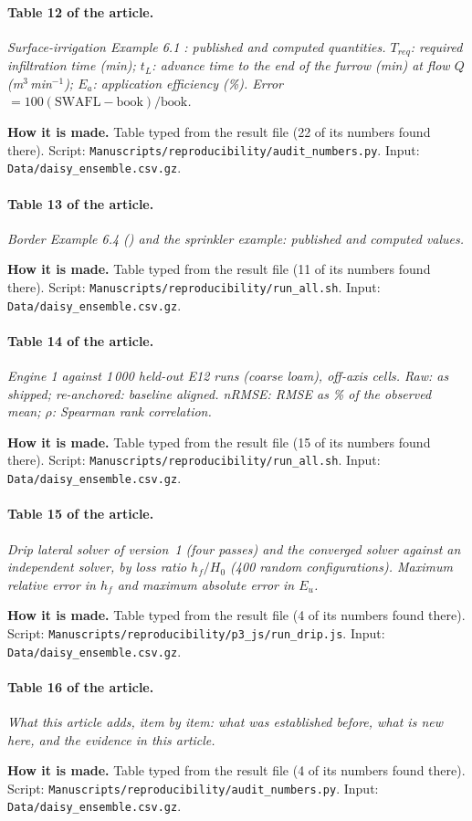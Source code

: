 \paragraph{Table 12 of the article.} \emph{Surface-irrigation Example 6.1 \citep{Walker1987}: published and computed quantities. $T_{req}$: required infiltration time (min); $t_L$: advance time to the end of the furrow (min) at flow $Q$ (m$^3$\,min$^{-1}$); $E_a$: application efficiency (\%). Error $=100(\text{SWAFL}-\text{book})/\text{book}$.}

\textbf{How it is made.} Table typed from the result file (22 of its numbers found there). Script: \nolinkurl{Manuscripts/reproducibility/audit_numbers.py}. Input: \nolinkurl{Data/daisy_ensemble.csv.gz}.

\paragraph{Table 13 of the article.} \emph{Border Example 6.4 (\citet{Walker1987}) and the sprinkler example: published and computed values.}

\textbf{How it is made.} Table typed from the result file (11 of its numbers found there). Script: \nolinkurl{Manuscripts/reproducibility/run_all.sh}. Input: \nolinkurl{Data/daisy_ensemble.csv.gz}.

\paragraph{Table 14 of the article.} \emph{Engine 1 against 1\,000 held-out E12 runs (coarse loam), off-axis cells. Raw: as shipped; re-anchored: baseline aligned. nRMSE: RMSE as \% of the observed mean; $\rho$: Spearman rank correlation.}

\textbf{How it is made.} Table typed from the result file (15 of its numbers found there). Script: \nolinkurl{Manuscripts/reproducibility/run_all.sh}. Input: \nolinkurl{Data/daisy_ensemble.csv.gz}.

\paragraph{Table 15 of the article.} \emph{Drip lateral solver of version~1 (four passes) and the converged solver against an independent solver, by loss ratio $h_f/H_0$ (400 random configurations). Maximum relative error in $h_f$ and maximum absolute error in $E_u$.}

\textbf{How it is made.} Table typed from the result file (4 of its numbers found there). Script: \nolinkurl{Manuscripts/reproducibility/p3_js/run_drip.js}. Input: \nolinkurl{Data/daisy_ensemble.csv.gz}.

\paragraph{Table 16 of the article.} \emph{What this article adds, item by item: what was established before, what is new here, and the evidence in this article.}

\textbf{How it is made.} Table typed from the result file (4 of its numbers found there). Script: \nolinkurl{Manuscripts/reproducibility/audit_numbers.py}. Input: \nolinkurl{Data/daisy_ensemble.csv.gz}.
